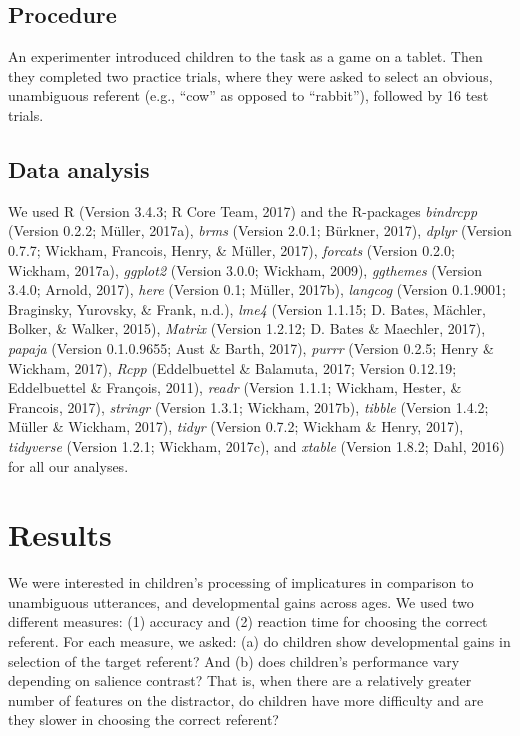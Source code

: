 \documentclass[man]{apa6}
\theoremstyle{definition}
\theoremstyle{definition}
\theoremstyle{definition}
\theoremstyle{remark}
\begin{document}
\subsection{Procedure}\label{procedure}

An experimenter introduced children to the task as a game on a tablet.
Then they completed two practice trials, where they were asked to select
an obvious, unambiguous referent (e.g., \enquote{cow} as opposed to
\enquote{rabbit}), followed by 16 test trials.

\subsection{Data analysis}\label{data-analysis}

We used R (Version 3.4.3; R Core Team, 2017) and the R-packages
\emph{bindrcpp} (Version 0.2.2; Müller, 2017a), \emph{brms} (Version
2.0.1; Bürkner, 2017), \emph{dplyr} (Version 0.7.7; Wickham, Francois,
Henry, \& Müller, 2017), \emph{forcats} (Version 0.2.0; Wickham, 2017a),
\emph{ggplot2} (Version 3.0.0; Wickham, 2009), \emph{ggthemes} (Version
3.4.0; Arnold, 2017), \emph{here} (Version 0.1; Müller, 2017b),
\emph{langcog} (Version 0.1.9001; Braginsky, Yurovsky, \& Frank, n.d.),
\emph{lme4} (Version 1.1.15; D. Bates, Mächler, Bolker, \& Walker,
2015), \emph{Matrix} (Version 1.2.12; D. Bates \& Maechler, 2017),
\emph{papaja} (Version 0.1.0.9655; Aust \& Barth, 2017), \emph{purrr}
(Version 0.2.5; Henry \& Wickham, 2017), \emph{Rcpp} (Eddelbuettel \&
Balamuta, 2017; Version 0.12.19; Eddelbuettel \& François, 2011),
\emph{readr} (Version 1.1.1; Wickham, Hester, \& Francois, 2017),
\emph{stringr} (Version 1.3.1; Wickham, 2017b), \emph{tibble} (Version
1.4.2; Müller \& Wickham, 2017), \emph{tidyr} (Version 0.7.2; Wickham \&
Henry, 2017), \emph{tidyverse} (Version 1.2.1; Wickham, 2017c), and
\emph{xtable} (Version 1.8.2; Dahl, 2016) for all our analyses.

\section{Results}\label{results}

We were interested in children's processing of implicatures in
comparison to unambiguous utterances, and developmental gains across
ages. We used two different measures: (1) accuracy and (2) reaction time
for choosing the correct referent. For each measure, we asked: (a) do
children show developmental gains in selection of the target referent?
And (b) does children's performance vary depending on salience contrast?
That is, when there are a relatively greater number of features on the
distractor, do children have more difficulty and are they slower in
choosing the correct referent?
\end{document}
